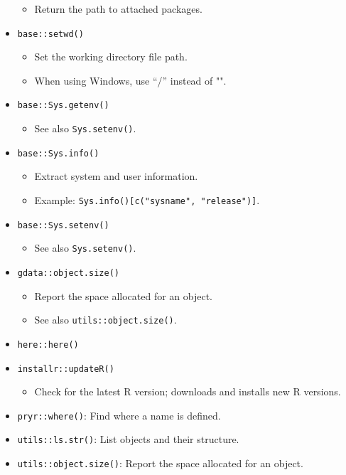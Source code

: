 \documentclass[
]{book}
\providecommand{\tightlist}{%
  \setlength{\itemsep}{0pt}\setlength{\parskip}{0pt}}
\begin{document}
\begin{itemize}
  \begin{itemize}
  \tightlist
  \item
    Return the path to attached packages.
  \end{itemize}
\item
  \texttt{base::setwd()}

  \begin{itemize}
  \tightlist
  \item
    Set the working directory file path.
  \item
    When using Windows, use ``/'' instead of "".
  \end{itemize}
\item
  \texttt{base::Sys.getenv()}

  \begin{itemize}
  \tightlist
  \item
    See also \texttt{Sys.setenv()}.
  \end{itemize}
\item
  \texttt{base::Sys.info()}

  \begin{itemize}
  \tightlist
  \item
    Extract system and user information.
  \item
    Example: \texttt{Sys.info(){[}c("sysname",\ "release"){]}}.
  \end{itemize}
\item
  \texttt{base::Sys.setenv()}

  \begin{itemize}
  \tightlist
  \item
    See also \texttt{Sys.setenv()}.
  \end{itemize}
\item
  \texttt{gdata::object.size()}

  \begin{itemize}
  \tightlist
  \item
    Report the space allocated for an object.
  \item
    See also \texttt{utils::object.size()}.
  \end{itemize}
\item
  \texttt{here::here()}
\item
  \texttt{installr::updateR()}

  \begin{itemize}
  \tightlist
  \item
    Check for the latest R version; downloads and installs new R versions.
  \end{itemize}
\item
  \texttt{pryr::where()}: Find where a name is defined.
\item
  \texttt{utils::ls.str()}: List objects and their structure.
\item
  \texttt{utils::object.size()}: Report the space allocated for an object.


\end{itemize}
\end{document}
